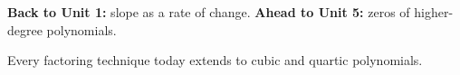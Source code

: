 \begin{spiralbox}
\textbf{Back to Unit 1:} slope as a rate of change. \quad
\textbf{Ahead to Unit 5:} zeros of higher-degree polynomials.\par
Every factoring technique today extends to cubic and quartic polynomials.
\end{spiralbox}
